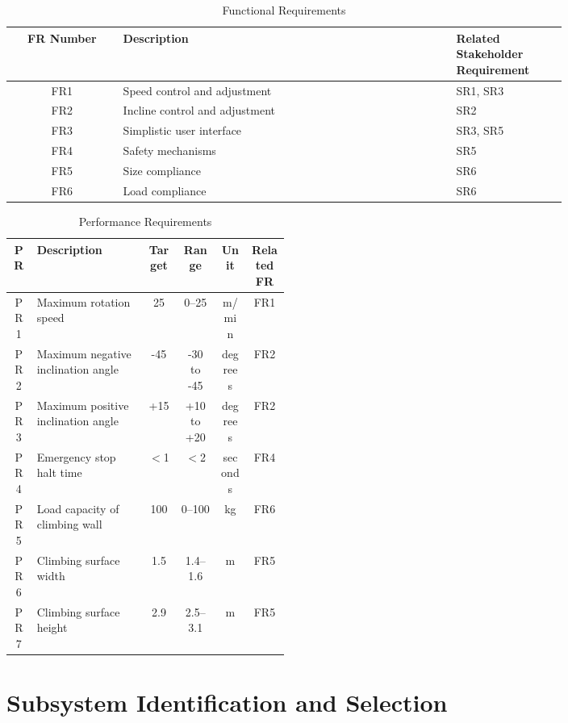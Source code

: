 \begin{table}[H]
\centering
\caption{Functional Requirements}
\label{tab:functional-requirements}
\begin{tabular}{|c|p{0.6\linewidth}|>{\centering\arraybackslash}p{0.2\linewidth}|}
\hline
\textbf{FR Number} & \textbf{Description} & \textbf{Related Stakeholder Requirement} \\
\hline
FR1 & Speed control and adjustment & SR1, SR3 \\
FR2 & Incline control and adjustment & SR2 \\
FR3 & Simplistic user interface & SR3, SR5 \\
FR4 & Safety mechanisms & SR5 \\
FR5 & Size compliance & SR6 \\
FR6 & Load compliance & SR6 \\
\hline
\end{tabular}
\end{table}

\begin{table}[H]
\centering
\caption{Performance Requirements}
\label{tab:performance-requirements}
\begin{tabular}{|c|p{0.4\linewidth}|c|c|c|c|}
\hline
\textbf{PR} & \textbf{Description} & \textbf{Target} & \textbf{Range} & \textbf{Unit} & \textbf{Related FR} \\
\hline
PR1 & Maximum rotation speed & 25 & 0--25 & m/min & FR1 \\
PR2 & Maximum negative inclination angle & -45 & -30 to -45 & degrees & FR2 \\
PR3 & Maximum positive inclination angle & +15 & +10 to +20 & degrees & FR2 \\
PR4 & Emergency stop halt time & $<$1 & $<$2 & seconds & FR4 \\
PR5 & Load capacity of climbing wall & 100 & 0--100 & kg & FR6 \\
PR6 & Climbing surface width & 1.5 & 1.4--1.6 & m & FR5 \\
PR7 & Climbing surface height & 2.9 & 2.5--3.1 & m & FR5 \\
\hline
\end{tabular}
\end{table}

\section{Subsystem Identification and Selection}
\label{sec:concept_selection}

